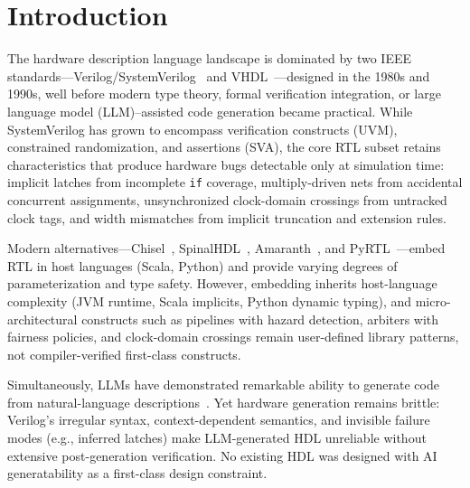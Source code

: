 \documentclass[manuscript]{acmart}
\begin{document}
\maketitle

\section{Introduction}\label{sec:intro}

The hardware description language landscape is dominated by two IEEE standards---Verilog/SystemVerilog~\cite{ieee1800} and VHDL~\cite{ieee1076}---designed in the 1980s and 1990s, well before modern type theory, formal verification integration, or large language model (LLM)--assisted code generation became practical.
While SystemVerilog has grown to encompass verification constructs (UVM), constrained randomization, and assertions (SVA), the core RTL subset retains characteristics that produce hardware bugs detectable only at simulation time:
implicit latches from incomplete \texttt{if} coverage, multiply-driven nets from accidental concurrent assignments, unsynchronized clock-domain crossings from untracked clock tags, and width mismatches from implicit truncation and extension rules.

Modern alternatives---Chisel~\cite{chisel}, SpinalHDL~\cite{spinalhdl}, Amaranth~\cite{amaranth}, and PyRTL~\cite{pyrtl}---embed RTL in host languages (Scala, Python) and provide varying degrees of parameterization and type safety.
However, embedding inherits host-language complexity (JVM runtime, Scala implicits, Python dynamic typing), and micro-architectural constructs such as pipelines with hazard detection, arbiters with fairness policies, and clock-domain crossings remain user-defined library patterns, not compiler-verified first-class constructs.

Simultaneously, LLMs have demonstrated remarkable ability to generate code from natural-language descriptions~\cite{codex,copilot}.
Yet hardware generation remains brittle: Verilog's irregular syntax, context-dependent semantics, and invisible failure modes (e.g., inferred latches) make LLM-generated HDL unreliable without extensive post-generation verification.
No existing HDL was designed with AI generatability as a first-class design constraint.
\end{document}

